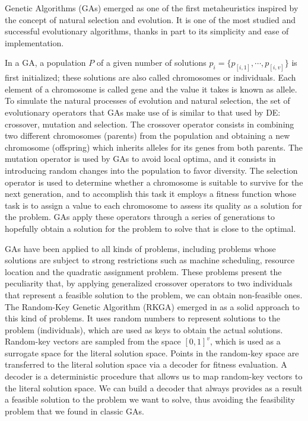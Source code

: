 \documentclass[review]{elsarticle}
\begin{document}
Genetic Algorithms (GAs) emerged as one of the first metaheuristics inspired by the concept of natural selection and evolution. It is one of the most studied and successful evolutionary algorithms, thanks in part to its simplicity and ease of implementation. \cite{fausto2019ants}

In a GA, a population $P$ of a given number of solutions $p_i = \{p_{[i,1]}, \cdots, p_{[i,v]}\}$ is first initialized; these solutions are also called chromosomes or individuals. Each element of a chromosome is called gene and the value it takes is known as allele. To simulate the natural processes of evolution and natural selection, the set of evolutionary operators that GAs make use of is similar to that used by DE: crossover, mutation and selection. The crossover operator consists in combining two different chromosomes (parents) from the population and obtaining a new chromosome (offspring) which inherits alleles for its genes from both parents. The mutation operator is used by GAs to avoid local optima, and it consists in introducing random changes into the population to favor diversity. The selection operator is used to determine whether a chromosome is suitable to survive for the next generation, and to accomplish this task it employs a fitness function whose task is to assign a value to each chromosome to assess its quality as a solution for the problem. GAs apply these operators through a series of generations to hopefully obtain a solution for the problem to solve that is close to the optimal. \cite{fausto2019ants}

GAs have been applied to all kinds of problems, including problems whose solutions are subject to strong restrictions such as machine scheduling, resource location and the quadratic assignment problem. These problems present the peculiarity that, by applying generalized crossover operators to two individuals that represent a feasible solution to the problem, we can obtain non-feasible ones. The Random-Key Genetic Algorithm (RKGA) emerged in \cite{bean1994genetic} as a solid approach to this kind of problems. It uses random numbers to represent solutions to the problem (individuals), which are used as keys to obtain the actual solutions. Random-key vectors are sampled from the space $[0,1]^{v}$, which is used as a surrogate space for the literal solution space. Points in the random-key space are transferred to the literal solution space via a decoder for fitness evaluation. A decoder is a deterministic procedure that allows us to map random-key vectors to the literal solution space. We can build a decoder that always provides as a result a feasible solution to the problem we want to solve, thus avoiding the feasibility problem that we found in classic GAs.
\end{document}

